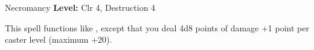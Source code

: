 {Necromancy}
{
	\textbf{Level:}
	Clr 4, Destruction 4\\
}
{
	This spell functions like , except that you deal 4d8 points of damage +1 point per caster level (maximum +20).

}
